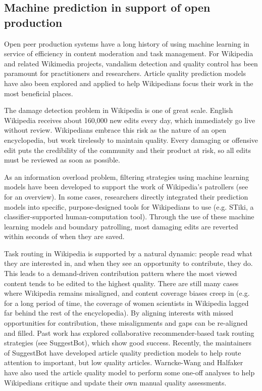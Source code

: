 \subsection{Machine prediction in support of open production}
Open peer production systems have a long history of using machine learning in service of efficiency in content moderation and task management. For Wikipedia and related Wikimedia projects, vandalism detection and quality control has been paramount for practitioners and researchers.  Article quality prediction models have also been explored and applied to help Wikipedians focus their work in the most beneficial places.

 The damage detection problem in Wikipedia is one of great scale.  English Wikipedia receives about 160,000 new edits every day, which immediately go live without review.  Wikipedians embrace this risk as the nature of an open encyclopedia, but work tirelessly to maintain quality. Every damaging or offensive edit puts the credibility of the community and their product at risk, so all edits must be reviewed as soon as possible\cite{geiger2010work}.

As an information overload problem, filtering strategies using machine learning models have been developed to support the work of Wikipedia's patrollers (see \cite{adler2011wikipedia} for an overview).  In some cases, researchers directly integrated their prediction models into specific, purpose-designed tools for Wikipedians to use (e.g. STiki\cite{west2010stiki}, a classifier-supported human-computation tool). Through the use of these machine learning models and boundary patrolling, most damaging edits are reverted within seconds of when they are saved\cite{geiger2013levee}.

Task routing in Wikipedia is supported by a natural dynamic: people read what they are interested in, and when they see an opportunity to contribute, they do.  This leads to a demand-driven contribution pattern where the most viewed content tends to be edited to the highest quality\cite{hill2014consider}.  There are still many cases where Wikipedia remains misaligned\cite{wang2015misalignment}, and content coverage biases creep in (e.g. for a long period of time, the coverage of women scientists in Wikipedia lagged far behind the rest of the encyclopedia\cite{halfaker2017interpolating}).  By aligning interests with missed opportunities for contribution, these misalignments and gaps can be re-aligned and filled.  Past work has explored collaborative recommender-based task routing strategies (see SuggestBot\cite{cosley2007suggestbot}), which show good success.  Recently, the maintainers of SuggestBot have developed article quality prediction models to help route attention to important, but low quality articles\cite{wang2013tell}.  Warncke-Wang and Halfaker have also used the article quality model to perform some one-off analyses to help Wikipedians critique and update their own manual quality assessments\cite{wang2014screening}.

